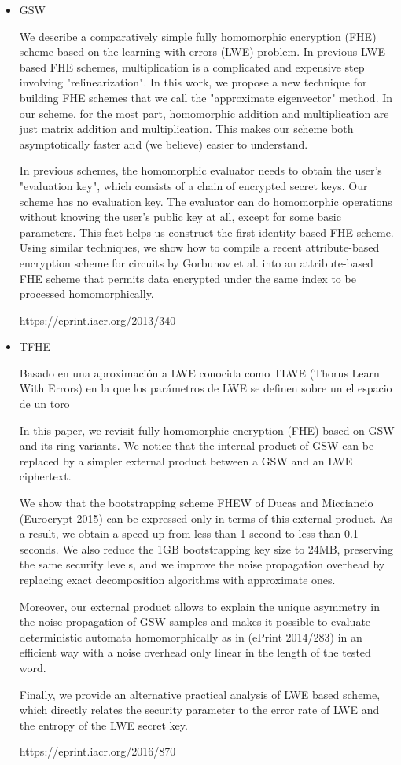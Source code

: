 \begin{itemize}

  \item GSW

  We describe a comparatively simple fully homomorphic encryption (FHE) scheme based on the learning with errors (LWE) problem. In previous LWE-based FHE schemes, multiplication is a complicated and expensive step involving "relinearization". In this work, we propose a new technique for building FHE schemes that we call the "approximate eigenvector" method. In our scheme, for the most part, homomorphic addition and multiplication are just matrix addition and multiplication. This makes our scheme both asymptotically faster and (we believe) easier to understand.

  In previous schemes, the homomorphic evaluator needs to obtain the user's "evaluation key", which consists of a chain of encrypted secret keys. Our scheme has no evaluation key. The evaluator can do homomorphic operations without knowing the user's public key at all, except for some basic parameters. This fact helps us construct the first identity-based FHE scheme. Using similar techniques, we show how to compile a recent attribute-based encryption scheme for circuits by Gorbunov et al. into an attribute-based FHE scheme that permits data encrypted under the same index to be processed homomorphically.

  https://eprint.iacr.org/2013/340

  \item TFHE

  Basado en una aproximación a LWE conocida como TLWE (Thorus Learn With Errors) en la que los parámetros de LWE se definen sobre un el espacio de un toro \cite{cheon_faster_2016}

  In this paper, we revisit fully homomorphic encryption (FHE) based on GSW and its ring variants. We notice that the internal product of GSW can be replaced by a simpler external product between a GSW and an LWE ciphertext.

  We show that the bootstrapping scheme FHEW of Ducas and Micciancio (Eurocrypt 2015) can be expressed only in terms of this external product. As a result, we obtain a speed up from less than 1 second to less than 0.1 seconds. We also reduce the 1GB bootstrapping key size to 24MB, preserving the same security levels, and we improve the noise propagation overhead by replacing exact decomposition algorithms with approximate ones.

  Moreover, our external product allows to explain the unique asymmetry in the noise propagation of GSW samples and makes it possible to evaluate deterministic automata homomorphically as in (ePrint 2014/283) in an efficient way with a noise overhead only linear in the length of the tested word.

  Finally, we provide an alternative practical analysis of LWE based scheme, which directly relates the security parameter to the error rate of LWE and the entropy of the LWE secret key.

  https://eprint.iacr.org/2016/870

\end{itemize}
